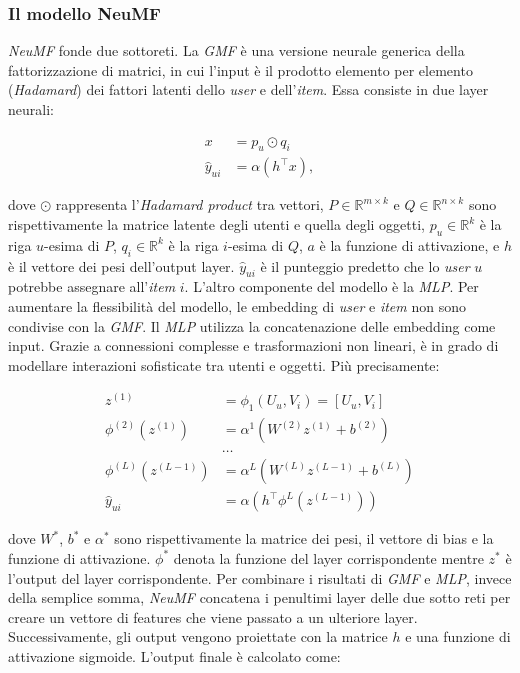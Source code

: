 \subsubsection{Il modello NeuMF}\label{neufm}

\textit{NeuMF} fonde due sottoreti. La \textit{GMF} è una versione neurale generica della fattorizzazione di matrici, in cui l'input è il prodotto elemento per elemento (\textit{Hadamard}) dei fattori latenti dello \textit{user} e dell'\textit{item}. Essa consiste in due layer neurali:

\[
\begin{split}
x &= p_u \odot q_i \\
\hat{y}_{ui} &= \alpha(h^\top x),
\end{split}
\]

dove $\odot$ rappresenta l'\textit{Hadamard product} tra vettori, $P \in \mathbb{R}^{m \times k}$ e $Q \in \mathbb{R}^{n \times k}$ sono rispettivamente la matrice latente degli utenti e quella degli oggetti, $p_u \in \mathbb{R}^{k}$ è la riga $u$-esima di $P$, $q_i \in \mathbb{R}^{ k}$ è la riga $i$-esima di $Q$, $a$ è la funzione di attivazione, e $h$ è il vettore dei pesi dell'output layer. $\hat{y}_{ui}$ è il punteggio predetto che lo \textit{user} $u$ potrebbe assegnare all'\textit{item} $i$. L'altro componente del modello è la \textit{MLP}. Per aumentare la flessibilità del modello, le embedding di \textit{user} e \textit{item} non sono condivise con la \textit{GMF}. Il \textit{MLP} utilizza la concatenazione delle embedding come input. Grazie a connessioni complesse e trasformazioni non lineari, è in grado di modellare interazioni sofisticate tra utenti e oggetti. Più precisamente:

\[
\begin{aligned}
z^{(1)} &= \phi_1(U_u, V_i) = \left[ U_u, V_i \right] \\
\phi^{(2)}(z^{(1)}) &= \alpha^1(W^{(2)} z^{(1)} + b^{(2)}) \\
&\dots \\
\phi^{(L)}(z^{(L-1)}) &= \alpha^L(W^{(L)} z^{(L-1)} + b^{(L)}) \\
\hat{y}_{ui} &= \alpha(h^\top \phi^L(z^{(L-1)}))
\end{aligned}
\]

dove $W^*$, $b^*$ e $\alpha^*$ sono rispettivamente la matrice dei pesi, il vettore di bias e la funzione di attivazione. $\phi^*$ denota la funzione del layer corrispondente mentre $z^*$ è l'output del layer corrispondente. Per combinare i risultati di \textit{GMF} e \textit{MLP}, invece della semplice somma, \textit{NeuMF} concatena i penultimi layer delle due sotto reti per creare un vettore di features che viene passato a un ulteriore layer. Successivamente, gli output vengono proiettate con la matrice $h$ e una funzione di attivazione sigmoide. L'output finale è calcolato come:

